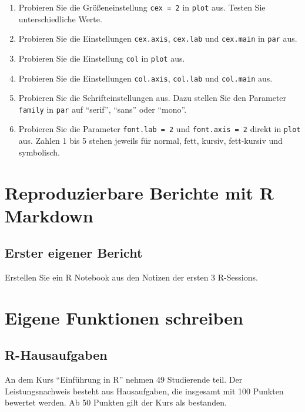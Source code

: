 \documentclass[]{book}
\providecommand{\tightlist}{%
  \setlength{\itemsep}{0pt}\setlength{\parskip}{0pt}}
\begin{document}
\begin{enumerate}
\def\labelenumi{\arabic{enumi}.}
\tightlist
\item
  Probieren Sie die Größeneinstellung \texttt{cex\ =\ 2} in \texttt{plot} aus. Testen Sie unterschiedliche Werte.
\item
  Probieren Sie die Einstellungen \texttt{cex.axis}, \texttt{cex.lab} und \texttt{cex.main} in \texttt{par} aus.
\item
  Probieren Sie die Einstellung \texttt{col} in \texttt{plot} aus.
\item
  Probieren Sie die Einstellungen \texttt{col.axis}, \texttt{col.lab} und \texttt{col.main} aus.
\item
  Probieren Sie die Schrifteinstellungen aus. Dazu stellen Sie den Parameter \texttt{family} in \texttt{par} auf ``serif'', ``sans'' oder ``mono''.
\item
  Probieren Sie die Parameter \texttt{font.lab\ =\ 2} und \texttt{font.axis\ =\ 2} direkt in \texttt{plot} aus. Zahlen 1 bis 5 stehen jeweils für normal, fett, kursiv, fett-kursiv und symbolisch.
\end{enumerate}

\hypertarget{reproduzierbare-berichte-mit-r-markdown-1}{%
\section{Reproduzierbare Berichte mit R Markdown}\label{reproduzierbare-berichte-mit-r-markdown-1}}

\hypertarget{erster-eigener-bericht}{%
\subsection{Erster eigener Bericht}\label{erster-eigener-bericht}}

Erstellen Sie ein R Notebook aus den Notizen der ersten 3 R-Sessions.

\hypertarget{eigene-funktionen-schreiben-1}{%
\section{Eigene Funktionen schreiben}\label{eigene-funktionen-schreiben-1}}

\hypertarget{r-hausaufgaben}{%
\subsection{R-Hausaufgaben}\label{r-hausaufgaben}}

An dem Kurs ``Einführung in R'' nehmen 49 Studierende teil. Der Leistungsnachweis besteht aus Hausaufgaben, die insgesamt mit 100 Punkten bewertet werden. Ab 50 Punkten gilt der Kurs als bestanden.
\end{document}
